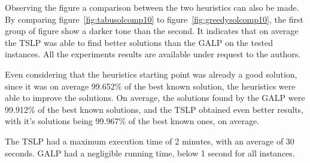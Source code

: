 Observing the figure a comparison between the two heuristics can also be made.
By comparing figure~\ref{fig:tabusolcomp10} to 
figure~\ref{fig:greedysolcomp10}, the first group 
of figure show a darker tone than the second. It indicates that on average the TSLP was able to find better
solutions than the GALP on the tested instances. All the experiments results are available under request to the authors.

Even considering that the heuristics starting point was already a good solution, since it was on average
99.652\% of the best known solution, the heuristics were able to improve the solutions. On average, 
the solutions found by the GALP were 99.912\% of the best known solutions, and the TSLP obtained 
even better results, with it's solutions being 99.967\% of the best known ones, on average.

The TSLP had a maximum execution time of 2 minutes, with an average of 30 seconds.
GALP had a negligible running time, below 1 second for all instances.

